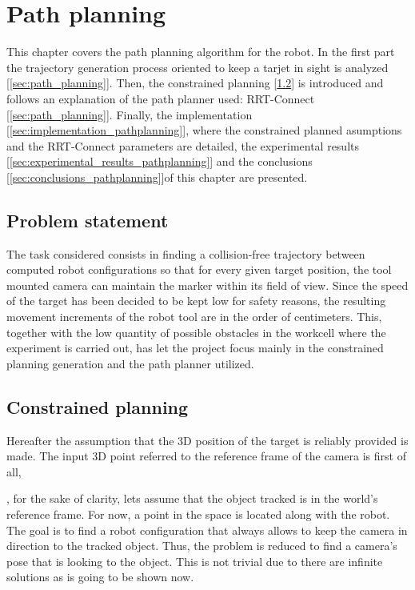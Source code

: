 \chapter{Path planning} %
\label{chap:path_planning}

This chapter covers the path planning algorithm for the robot.
In the first part the trajectory generation process oriented to keep a tarjet in sight is analyzed [\ref{sec:path_planning}]. Then, the constrained planning [\ref{sec:constrained_planning}] is introduced and follows an explanation of the path planner used: RRT-Connect [\ref{sec:path_planning}]. Finally, the implementation [\ref{sec:implementation_pathplanning}], where the constrained planned asumptions and the RRT-Connect parameters are detailed, the experimental results [\ref{sec:experimental_results_pathplanning}] and the conclusions [\ref{sec:conclusions_pathplanning}]of this chapter are presented.

\section{Problem statement} %
\label{sec:path_planning_in_keep_object_in_sight}
The task considered consists in finding a collision-free trajectory between computed robot configurations so that for every given target position, the tool mounted camera can maintain the marker within its field of view. 
Since the speed of the target has been decided to be kept low for safety reasons, the resulting movement increments of the robot tool are in the order of centimeters. 
This, together with the low quantity of possible obstacles in the workcell where the experiment is carried out, has let the project focus mainly in the constrained planning generation and the path planner utilized.

\section{Constrained planning} %
\label{sec:constrained_planning}
Hereafter the assumption that the 3D position of the target is reliably provided is made.
The input 3D point referred to the reference frame of the camera is first of all, 


, for the sake of clarity, lets assume that the object tracked is in the world's reference frame. 
For now, a point in the space is located along with the robot.
The goal is to find a robot configuration that always allows to keep the camera in direction to the tracked object.
Thus, the problem is reduced to find a camera's pose that is looking to the object.
This is not trivial due to there are infinite solutions as is going to be shown now. \\

